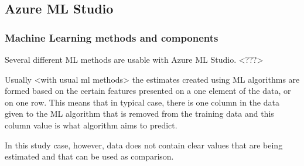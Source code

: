 \documentclass[english, 12pt, a4paper, elec, utf8, a-1b, online]{aaltothesis}
\begin{document}
\subsection{Azure ML Studio}\label{subsec:azure-ml-studio}

\subsubsection*{Machine Learning methods and components}
Several different ML methods are usable with Azure ML Studio. <???>

Usually <with usual ml methods> the estimates
created using ML algorithms
are formed based on the certain features
presented on a one element of the data,
or on one row.
This means that in typical case,
there is one column in the data
given to the ML algorithm
that is removed from the training data
and this column value is what algorithm
aims to predict.

In this study case, however,
data does not contain clear values
that are being estimated
and that can be used as comparison.
\end{document}
